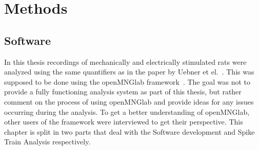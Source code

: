 \chapter{Methods}
\begin{comment}
In this chapter I will describe the methods I used for creating the software and spike analysis results in this thesis\\
-Describe the different data structures (Neo, old openMNGlab version)\\
-Detail the development process, issues during development and how they were resolved\\
-Describe the finished analysis pipeline with the help of a simplified graph\\
-present use cases (3 students analysing different data, experimental scientist)\\

Spike Analysis:\\
-Data\\
-definition of spike trains\\
-quantifiers\\

TODO:\\
-Add what I did: somewhat detailed description of my process in developing the notebook\\
-start from the notebook which was started by Radomir for custom structure (before openMNGlab)\\
-adding of importers from old openMNGlab version (code from Fabian)\\
-adding of neo importers after integration into openMNGlab\\
\end{comment}
\section{Software}
In this thesis recordings of mechanically and electrically stimulated rats were analyzed using the same quantifiers as in the paper by Uebner et el.~\cite{roberto}. This was supposed to be done using the openMNGlab framework~\cite{schlebusch_openmnglab_2021}. The goal was not to provide a fully functioning analysis system as part of this thesis, but rather comment on the process of using openMNGlab and provide ideas for any issues occurring during the analysis. To get a better understanding of openMNGlab, other users of the framework were interviewed to get their perspective.
This chapter is split in two parts that deal with the Software development and Spike Train Analysis respectively.

